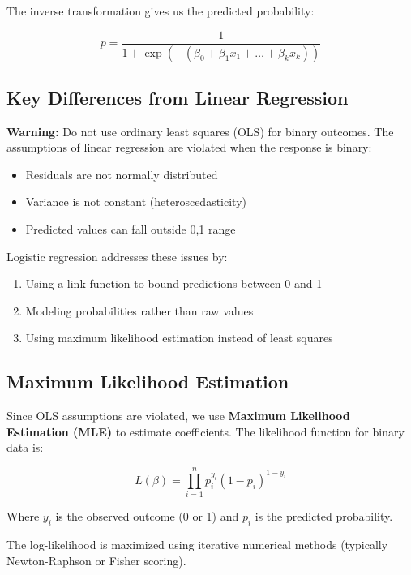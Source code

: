 \documentclass[
]{article}
\begin{document}
The inverse transformation gives us the predicted probability:

\[p = \frac{1}{1 + \exp( - \left( \beta_{0} + \beta_{1}x_{1} + \ldots + \beta_{k}x_{k} \right))}\]

\textbf{ }

\subsection{Key Differences from Linear Regression}

\textbf{Warning: } Do not use ordinary least squares (OLS) for binary
outcomes. The assumptions of linear regression are violated when the
response is binary:

\begin{itemize}
\item
  Residuals are not normally distributed
\item
  Variance is not constant (heteroscedasticity)
\item
  Predicted values can fall outside 0,1 range
\end{itemize}

Logistic regression addresses these issues by:

\begin{enumerate}
\item
  Using a link function to bound predictions between 0 and 1
\item
  Modeling probabilities rather than raw values
\item
  Using maximum likelihood estimation instead of least squares
\end{enumerate}

\textbf{ }

\subsection{Maximum Likelihood Estimation}

Since OLS assumptions are violated, we use \textbf{Maximum Likelihood
Estimation (MLE)} to estimate coefficients. The likelihood function for
binary data is:

\[L(\beta) = \prod_{i = 1}^{n}p_{i}^{y_{i}}\left( 1 - p_{i} \right)^{1 - y_{i}}\]

Where \(y_{i}\) is the observed outcome (0 or 1) and \(p_{i}\) is the
predicted probability.

The log-likelihood is maximized using iterative numerical methods
(typically Newton-Raphson or Fisher scoring).
\end{document}
